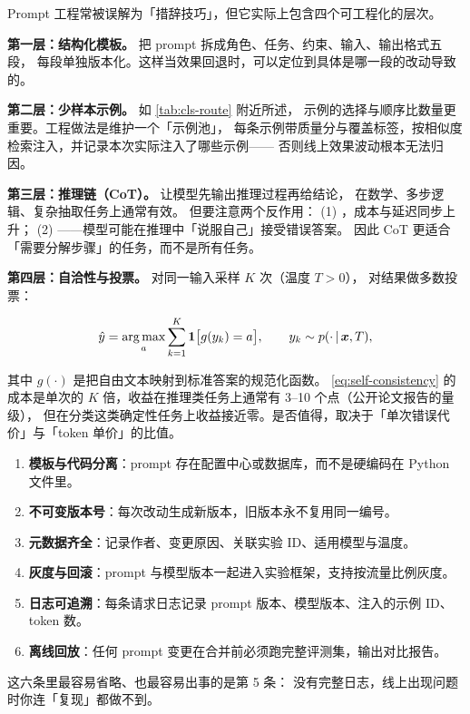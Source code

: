 Prompt 工程常被误解为「措辞技巧」，但它实际上包含四个可工程化的层次。

\textbf{第一层：结构化模板。} 把 prompt 拆成角色、任务、约束、输入、输出格式五段，
每段单独版本化。这样当效果回退时，可以定位到具体是哪一段的改动导致的。

\textbf{第二层：少样本示例。} 如 \cref{tab:cls-route} 附近所述，
示例的选择与顺序比数量更重要。工程做法是维护一个「示例池」，
每条示例带质量分与覆盖标签，按相似度检索注入，并记录本次实际注入了哪些示例——
否则线上效果波动根本无法归因。

\textbf{第三层：推理链（CoT）。} 让模型先输出推理过程再给结论，
在数学、多步逻辑、复杂抽取任务上通常有效。
但要注意两个反作用：
(1) ，成本与延迟同步上升；
(2) ——模型可能在推理中「说服自己」接受错误答案。
因此 CoT 更适合「需要分解步骤」的任务，而不是所有任务。

\textbf{第四层：自洽性与投票。} 对同一输入采样 $K$ 次（温度 $T>0$），
对结果做多数投票：

\begin{equation}
\hat{y} = \operatorname*{arg\,max}_{a} \sum_{k=1}^{K} \mathbf{1}\big[ g(y_k) = a \big],
\qquad y_k \sim p(\cdot \,\vert\, \bm{x}, T),
\label{eq:self-consistency}
\end{equation}

其中 $g(\cdot)$ 是把自由文本映射到标准答案的规范化函数。
\cref{eq:self-consistency} 的成本是单次的 $K$ 倍，收益在推理类任务上通常有 3--10 个点（公开论文报告的量级），
但在分类这类确定性任务上收益接近零。是否值得，取决于「单次错误代价」与「token 单价」的比值。

\begin{toolbox}
\begin{enumerate}
  \item \textbf{模板与代码分离}：prompt 存在配置中心或数据库，而不是硬编码在 Python 文件里。
  \item \textbf{不可变版本号}：每次改动生成新版本，旧版本永不复用同一编号。
  \item \textbf{元数据齐全}：记录作者、变更原因、关联实验 ID、适用模型与温度。
  \item \textbf{灰度与回滚}：prompt 与模型版本一起进入实验框架，支持按流量比例灰度。
  \item \textbf{日志可追溯}：每条请求日志记录 prompt 版本、模型版本、注入的示例 ID、token 数。
  \item \textbf{离线回放}：任何 prompt 变更在合并前必须跑完整评测集，输出对比报告。
\end{enumerate}
这六条里最容易省略、也最容易出事的是第 5 条：
没有完整日志，线上出现问题时你连「复现」都做不到。
\end{toolbox}

